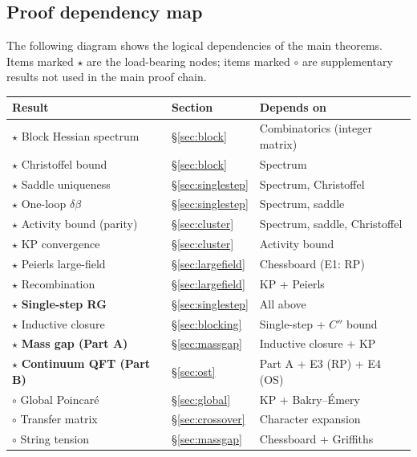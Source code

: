 \documentclass[11pt]{article}
\theoremstyle{definition}
\begin{document}
\subsection{Proof dependency map}\label{subsec:proofmap}

The following diagram shows the logical dependencies of the main
theorems.  Items marked $\star$ are the load-bearing nodes;
items marked $\circ$ are supplementary results not used in the
main proof chain.

\begin{center}
\renewcommand{\arraystretch}{1.3}
\begin{tabular}{@{}p{5.5cm}p{2.5cm}p{5.5cm}@{}}
\toprule
\textbf{Result} & \textbf{Section} & \textbf{Depends on} \\
\midrule
$\star$ Block Hessian spectrum
  & \S\ref{sec:block} & Combinatorics (integer matrix) \\
$\star$ Christoffel bound
  & \S\ref{sec:block} & Spectrum \\
$\star$ Saddle uniqueness
  & \S\ref{sec:singlestep} & Spectrum, Christoffel \\
$\star$ One-loop $\delta\beta$
  & \S\ref{sec:singlestep} & Spectrum, saddle \\
$\star$ Activity bound (parity)
  & \S\ref{sec:cluster} & Spectrum, saddle, Christoffel \\
$\star$ KP convergence
  & \S\ref{sec:cluster} & Activity bound \\
$\star$ Peierls large-field
  & \S\ref{sec:largefield} & Chessboard (E1: RP) \\
$\star$ Recombination
  & \S\ref{sec:largefield} & KP + Peierls \\
$\star$ \textbf{Single-step RG}
  & \S\ref{sec:singlestep} & All above \\
$\star$ Inductive closure
  & \S\ref{sec:blocking} & Single-step + $C''$ bound \\
$\star$ \textbf{Mass gap (Part A)}
  & \S\ref{sec:massgap} & Inductive closure + KP \\
$\star$ \textbf{Continuum QFT (Part B)}
  & \S\ref{sec:ost} & Part A + E3 (RP) + E4 (OS) \\
\midrule
$\circ$ Global Poincar\'e
  & \S\ref{sec:global} & KP + Bakry--\'Emery \\
$\circ$ Transfer matrix
  & \S\ref{sec:crossover} & Character expansion \\
$\circ$ String tension
  & \S\ref{sec:massgap} & Chessboard + Griffiths \\
\bottomrule
\end{tabular}
\end{center}
\end{document}

